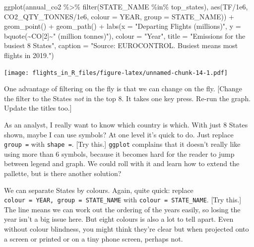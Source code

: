 \documentclass[
]{book}
\newenvironment{Shaded}{\begin{snugshade}}{\end{snugshade}}
\newcommand{\AttributeTok}[1]{\textcolor[rgb]{0.77,0.63,0.00}{#1}}
\newcommand{\DecValTok}[1]{\textcolor[rgb]{0.00,0.00,0.81}{#1}}
\newcommand{\FloatTok}[1]{\textcolor[rgb]{0.00,0.00,0.81}{#1}}
\newcommand{\FunctionTok}[1]{\textcolor[rgb]{0.00,0.00,0.00}{#1}}
\newcommand{\NormalTok}[1]{#1}
\newcommand{\SpecialCharTok}[1]{\textcolor[rgb]{0.00,0.00,0.00}{#1}}
\newcommand{\StringTok}[1]{\textcolor[rgb]{0.31,0.60,0.02}{#1}}
\begin{document}
\begin{Shaded}
\begin{Highlighting}[]
\FunctionTok{ggplot}\NormalTok{(annual\_co2 }\SpecialCharTok{\%\textgreater{}\%} 
         \FunctionTok{filter}\NormalTok{(STATE\_NAME }\SpecialCharTok{\%in\%}\NormalTok{ top\_states), }
       \FunctionTok{aes}\NormalTok{(TF}\SpecialCharTok{/}\FloatTok{1e6}\NormalTok{, CO2\_QTY\_TONNES}\SpecialCharTok{/}\FloatTok{1e6}\NormalTok{, }
           \AttributeTok{colour =}\NormalTok{ YEAR, }\AttributeTok{group =}\NormalTok{ STATE\_NAME)) }\SpecialCharTok{+}
  \FunctionTok{geom\_point}\NormalTok{() }\SpecialCharTok{+} 
  \FunctionTok{geom\_path}\NormalTok{() }\SpecialCharTok{+}
  \FunctionTok{labs}\NormalTok{(}\AttributeTok{x =} \StringTok{"Departing Flights (millions)"}\NormalTok{, }
       \AttributeTok{y =} \FunctionTok{bquote}\NormalTok{(}\SpecialCharTok{\textasciitilde{}}\NormalTok{CO[}\DecValTok{2}\NormalTok{]}\SpecialCharTok{\textasciitilde{}}\StringTok{" (million tonnes)"}\NormalTok{),}
       \AttributeTok{colour =} \StringTok{"Year"}\NormalTok{,}
       \AttributeTok{title =} \StringTok{"Emissions for the busiest 8 States"}\NormalTok{,}
       \AttributeTok{caption =} \StringTok{"Source: EUROCONTROL. \textquotesingle{}Busiest\textquotesingle{} means most flights in 2019."}\NormalTok{)}
\end{Highlighting}
\end{Shaded}

\texttt{[image: flights\_in\_R\_files/figure-latex/unnamed-chunk-14-1.pdf]}

One advantage of filtering on the fly is that we can change on the fly. {[}Change the filter to the States \emph{not} in the top 8. It takes one key press. Re-run the graph. Update the titles too.{]}

As an analyst, I really want to know which country is which. With just 8 States shown, maybe I can use symbols? At one level it's quick to do. Just replace \texttt{group\ =} with \texttt{shape\ =}. {[}Try this.{]} \texttt{ggplot} complains that it doesn't really like using more than 6 symbols, because it becomes hard for the reader to jump between legend and graph. We could roll with it and learn how to extend the pallette, but is there another solution?

We can separate States by colours. Again, quite quick: replace \texttt{colour\ =\ YEAR,\ group\ =\ STATE\_NAME} with \texttt{colour\ =\ STATE\_NAME}. {[}Try this.{]} The line means we can work out the ordering of the years easily, so losing the year isn't a big issue here. But eight colours is also a lot to tell apart. Even without colour blindness, you might think they're clear but when projected onto a screen or printed or on a tiny phone screen, perhaps not.
\end{document}
